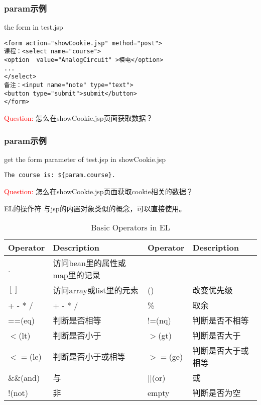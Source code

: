 \documentclass{beamer}
\begin{document}
\begin{frame}[fragile]
\frametitle{param示例}
\begin{block}{the form in test.jsp}
\begin{lstlisting}
<form action="showCookie.jsp" method="post">
课程：<select name="course">
<option  value="AnalogCircuit" >模电</option>
...
</select>
备注：<input name="note" type="text">
<button type="submit">submit</button>
</form>
\end{lstlisting}
\end{block}
\textcolor{red}{Question: }怎么在showCookie.jsp页面获取数据？
\end{frame}
\begin{frame}[fragile]
\frametitle{param示例}
\begin{block}{get the form parameter of test.jsp in showCookie.jsp}
\begin{lstlisting}
The course is: ${param.course}.
\end{lstlisting}
\end{block}
\textcolor{red}{Question: }怎么在showCookie.jsp页面获取cookie相关的数据？
\end{frame}
\begin{frame}{EL的操作符}
与jsp的内置对象类似的概念，可以直接使用。
\begin{table}
\begin{tabular}{lp{9em}ll}
\toprule
\textbf{Operator}&\textbf{Description}&\textbf{Operator}&\textbf{Description}\\
\midrule
.&访问bean里的属性或map里的记录&\\
$[]$&访问array或list里的元素&()&改变优先级\\
+ - * /&+ - * /&\%&取余\\
==(eq)&判断是否相等&!=(nq)&判断是否不相等\\
$<$(lt)&判断是否小于&$>$(gt)&判断是否大于\\
$<=$(le)&判断是否小于或相等&$>=$(ge)&判断是否大于或相等\\
\&\&(and)&与&||(or)&或\\
!(not)&非&empty&判断是否为空\\

\bottomrule
\end{tabular}
\caption{Basic Operators in EL}
\end{table}
\end{frame}
\end{document}
